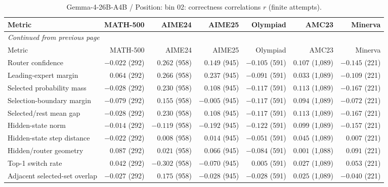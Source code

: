 \begingroup\scriptsize\setlength{\tabcolsep}{4pt}
\begin{longtable}{@{}lrrrrrr@{}}
\caption{Gemma-4-26B-A4B / Position: bin 02: correctness correlations $r$ (finite attempts).}\label{tab:multi-gemma-position-bin_02}\\
\toprule
Metric & MATH-500 & AIME24 & AIME25 & Olympiad & AMC23 & Minerva \\
\midrule\endfirsthead
\multicolumn{7}{l}{\textit{Continued from previous page}}\\
\toprule
Metric & MATH-500 & AIME24 & AIME25 & Olympiad & AMC23 & Minerva \\
\midrule\endhead
\bottomrule\endfoot
Router confidence & $-0.022$ (292) & $0.262$ (958) & $0.149$ (945) & $-0.105$ (591) & $0.107$ (1,089) & $-0.145$ (221) \\
Leading-expert margin & $0.064$ (292) & $0.266$ (958) & $0.237$ (945) & $-0.091$ (591) & $0.033$ (1,089) & $-0.109$ (221) \\
Selected probability mass & $-0.028$ (292) & $0.230$ (958) & $0.108$ (945) & $-0.117$ (591) & $0.113$ (1,089) & $-0.167$ (221) \\
Selection-boundary margin & $-0.079$ (292) & $0.155$ (958) & $-0.005$ (945) & $-0.117$ (591) & $0.094$ (1,089) & $-0.072$ (221) \\
Selected/rest mean gap & $-0.028$ (292) & $0.230$ (958) & $0.108$ (945) & $-0.117$ (591) & $0.113$ (1,089) & $-0.167$ (221) \\
Hidden-state norm & $-0.014$ (292) & $-0.119$ (958) & $-0.192$ (945) & $-0.122$ (591) & $0.099$ (1,089) & $-0.157$ (221) \\
Hidden-state step distance & $-0.022$ (292) & $0.008$ (958) & $0.014$ (945) & $-0.051$ (591) & $0.045$ (1,089) & $0.007$ (221) \\
Hidden/router geometry & $0.087$ (292) & $0.021$ (958) & $0.066$ (945) & $-0.084$ (591) & $0.001$ (1,088) & $0.091$ (221) \\
Top-1 switch rate & $0.042$ (292) & $-0.302$ (958) & $-0.070$ (945) & $0.005$ (591) & $0.027$ (1,089) & $0.053$ (221) \\
Adjacent selected-set overlap & $-0.027$ (292) & $0.175$ (958) & $-0.028$ (945) & $-0.028$ (591) & $0.025$ (1,089) & $-0.040$ (221) \\
\end{longtable}\endgroup

